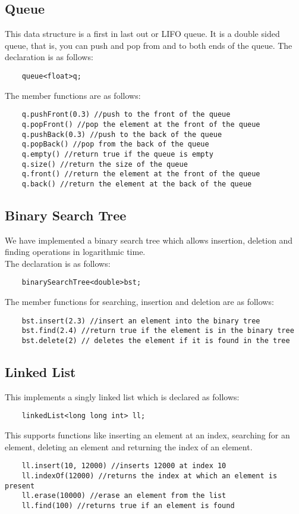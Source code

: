 \documentclass[12pt]{article}
\begin{document}
\subsection{Queue}
This data structure is a first in last out or LIFO queue. It is a double sided queue, that is, you can push and pop from and to both ends of the queue.
The declaration is as follows:
\begin{verbatim}
    queue<float>q;
\end{verbatim}
The member functions are as follows:
\begin{verbatim}
    q.pushFront(0.3) //push to the front of the queue
    q.popFront() //pop the element at the front of the queue
    q.pushBack(0.3) //push to the back of the queue
    q.popBack() //pop from the back of the queue
    q.empty() //return true if the queue is empty
    q.size() //return the size of the queue
    q.front() //return the element at the front of the queue
    q.back() //return the element at the back of the queue
\end{verbatim}

\subsection{Binary Search Tree}
We have implemented a binary search tree which allows insertion, deletion and finding operations in logarithmic time.
\\
The declaration is as follows:
\begin{verbatim}
    binarySearchTree<double>bst;
\end{verbatim}
The member functions for searching, insertion and deletion are as follows:
\begin{verbatim}
    bst.insert(2.3) //insert an element into the binary tree
    bst.find(2.4) //return true if the element is in the binary tree
    bst.delete(2) // deletes the element if it is found in the tree
\end{verbatim}

\subsection{Linked List}
This implements a singly linked list which is declared as follows:
\begin{verbatim}
    linkedList<long long int> ll;
\end{verbatim}
This supports functions like inserting an element at an index, searching for an element, deleting an element and returning the index of an element.
\begin{verbatim}
    ll.insert(10, 12000) //inserts 12000 at index 10
    ll.indexOf(12000) //returns the index at which an element is present
    ll.erase(10000) //erase an element from the list
    ll.find(100) //returns true if an element is found
\end{verbatim}
\end{document}
